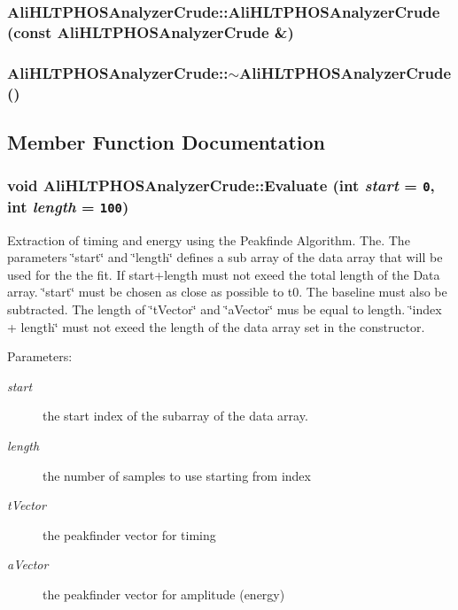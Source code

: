 \subsubsection{\setlength{\rightskip}{0pt plus 5cm}Ali\-HLTPHOSAnalyzer\-Crude::Ali\-HLTPHOSAnalyzer\-Crude (const {\bf Ali\-HLTPHOSAnalyzer\-Crude} \&)}\label{classAliHLTPHOSAnalyzerCrude_a1}


\subsubsection{\setlength{\rightskip}{0pt plus 5cm}Ali\-HLTPHOSAnalyzer\-Crude::$\sim${\bf Ali\-HLTPHOSAnalyzer\-Crude} ()\hspace{0.3cm}{\tt  [virtual]}}\label{classAliHLTPHOSAnalyzerCrude_a3}




\subsection{Member Function Documentation}
\subsubsection{\setlength{\rightskip}{0pt plus 5cm}void Ali\-HLTPHOSAnalyzer\-Crude::Evaluate (int {\em start} = {\tt 0}, int {\em length} = {\tt 100})\hspace{0.3cm}{\tt  [virtual]}}\label{classAliHLTPHOSAnalyzerCrude_a4}


Extraction of timing and energy using the Peakfinde Algorithm. The. The parameters \char`\"{}start\char`\"{} and \char`\"{}length\char`\"{} defines a sub array of the data array that will be used for the the fit. If start+length must not exeed the total length of the Data array. \char`\"{}start\char`\"{} must be chosen as close as possible to t0. The baseline must also be subtracted. The length of \char`\"{}t\-Vector\char`\"{} and \char`\"{}a\-Vector\char`\"{} mus be equal to length. \char`\"{}index + length\char`\"{} must not exeed the length of the data array set in the constructor. \begin{Desc}
\item[Parameters:]
\begin{description}
\item[{\em start}]the start index of the subarray of the data array. \item[{\em length}]the number of samples to use starting from index \item[{\em t\-Vector}]the peakfinder vector for timing \item[{\em a\-Vector}]the peakfinder vector for amplitude (energy) \end{description}
\end{Desc}


